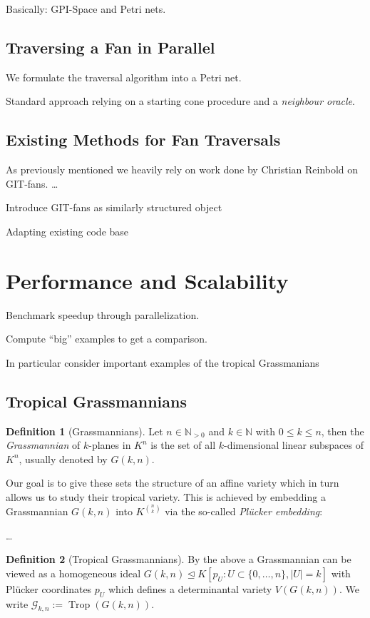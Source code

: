 \documentclass[
  paper=a4,
  DIV=14,
  fontsize=12pt,
  titlepage,
  bibliography=totoc,
  pagesize=pdftex
]{scrartcl}
\numberwithin{figure}{section}
\numberwithin{equation}{section}
\numberwithin{table}{section}
\newcommand*\setN{\mathds{N}}
\let\idealof\trianglelefteq
\DeclareMathOperator{\Trop}{Trop}
\theoremstyle{definition}
\newtheorem{definition}{Definition}
\numberwithin{definition}{section}
\begin{document}
Basically: GPI-Space and Petri nets.

\subsection{Traversing a Fan in Parallel}

We formulate the traversal algorithm into a Petri net.

Standard approach relying on a starting cone procedure and a \emph{neighbour oracle}.

\subsection{Existing Methods for Fan Traversals}

As previously mentioned we heavily rely on work done by Christian Reinbold on GIT-fans.
\dots

Introduce GIT-fans as similarly structured object

Adapting existing code base

\section{Performance and Scalability}

Benchmark speedup through parallelization.

Compute \enquote{big} examples to get a comparison.

In particular consider important examples of the tropical Grassmanians

\subsection{Tropical Grassmannians}

\begin{definition}[Grassmannians]
  Let $n \in \setN_{>0}$ and $k \in \setN$ with $0 \leq k \leq n$, then the
  \emph{Grassmannian} of $k$-planes in $K^n$ is the set of all $k$-dimensional linear
  subspaces of $K^n$, usually denoted by $G(k, n)$.
\end{definition}

Our goal is to give these sets the structure of an affine variety which in turn allows us
to study their tropical variety. This is achieved by embedding a Grassmannian $G(k, n)$
into $K^{\binom nk}$ via the so-called \emph{Plücker embedding}:

\dots

\begin{definition}[Tropical Grassmannians]
  By the above a Grassmannian can be viewed as a homogeneous ideal $G(k,n) \idealof K[ p_U
  : U \subset \{0, \dots, n \}, |U|=k ]$ with Plücker coordinates $p_U$ which defines a
  determinantal variety $V(G(k, n))$. We write $\mathcal G_{k,n} := \Trop(G(k,n))$.
\end{definition}
\end{document}
